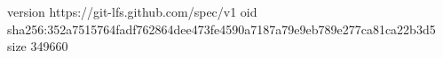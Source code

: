 version https://git-lfs.github.com/spec/v1
oid sha256:352a7515764fadf762864dee473fe4590a7187a79e9eb789e277ca81ca22b3d5
size 349660

